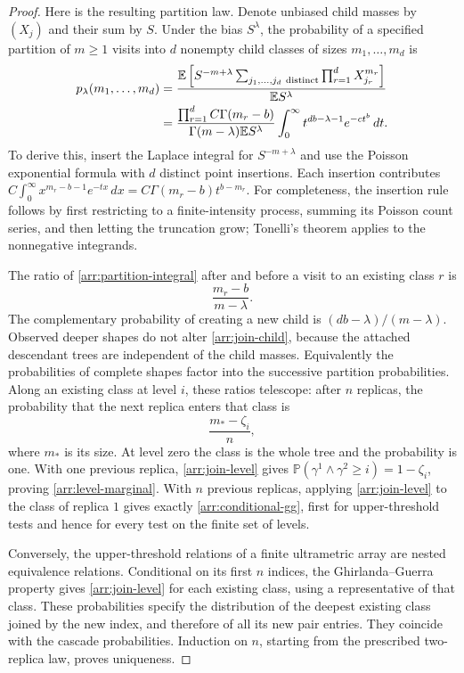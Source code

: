 \begin{proof}
Here is the resulting partition law.  Denote unbiased child masses by
$(X_j)$ and their sum by $S$.  Under the bias $S^\lambda$, the probability
of a specified partition of $m\geq1$ visits into $d$ nonempty child classes
of sizes $m_1,\ldots,m_d$ is
\begin{align}
 p_\lambda(m_1,\ldots,m_d)
 &=\frac{\mathbb E\left[S^{-m+\lambda}
          \sum_{j_1,\ldots,j_d\ \mathrm{distinct}}
                     \prod_{r=1}^dX_{j_r}^{m_r}\right]}
         {\mathbb E S^\lambda}\notag\\
 &=\frac{\prod_{r=1}^d C\Gamma(m_r-b)}
        {\Gamma(m-\lambda)\mathbb E S^\lambda}
   \int_0^\infty t^{db-\lambda-1}e^{-ct^b}\,dt.
 \label{arr:partition-integral}
\end{align}
To derive this, insert the Laplace integral for $S^{-m+\lambda}$ and use
the Poisson exponential formula with $d$ distinct point insertions.  Each
insertion contributes
$C\int_0^\infty x^{m_r-b-1}e^{-tx}\,dx
=C\Gamma(m_r-b)t^{b-m_r}$.
For completeness, the insertion rule follows by first restricting to a
finite-intensity process, summing its Poisson count series, and then
letting the truncation grow; Tonelli's theorem applies to the nonnegative
integrands.

The ratio of \eqref{arr:partition-integral} after and before a visit to
an existing class $r$ is
\begin{equation}
 \frac{m_r-b}{m-\lambda}.
 \label{arr:join-child}
\end{equation}
The complementary probability of creating a new child is
$(db-\lambda)/(m-\lambda)$.  Observed deeper shapes do not alter
\eqref{arr:join-child}, because the attached descendant trees are
independent of the child masses.  Equivalently the probabilities of
complete shapes factor into the successive partition probabilities.
Along an existing class at level $i$, these ratios telescope: after $n$
replicas, the probability that the next replica enters that class is
\begin{equation}
 \frac{m_*-\zeta_i}{n},
 \label{arr:join-level}
\end{equation}
where $m_*$ is its size.  At level zero the class is the whole tree and
the probability is one.  With one previous replica,
\eqref{arr:join-level} gives
$\mathbb P(\gamma^1\wedge\gamma^2\geq i)=1-\zeta_i$, proving
\eqref{arr:level-marginal}.  With $n$ previous replicas, applying
\eqref{arr:join-level} to the class of replica $1$ gives exactly
\eqref{arr:conditional-gg}, first for upper-threshold tests and hence for
every test on the finite set of levels.

Conversely, the upper-threshold relations of a finite ultrametric array
are nested equivalence relations.  Conditional on its first $n$ indices,
the Ghirlanda--Guerra property gives
\eqref{arr:join-level} for each existing class, using a representative of
that class.  These probabilities specify the distribution of the deepest
existing class joined by the new index, and therefore of all its new
pair entries.  They coincide with the cascade probabilities.  Induction
on $n$, starting from the prescribed two-replica law, proves uniqueness.
\end{proof}

